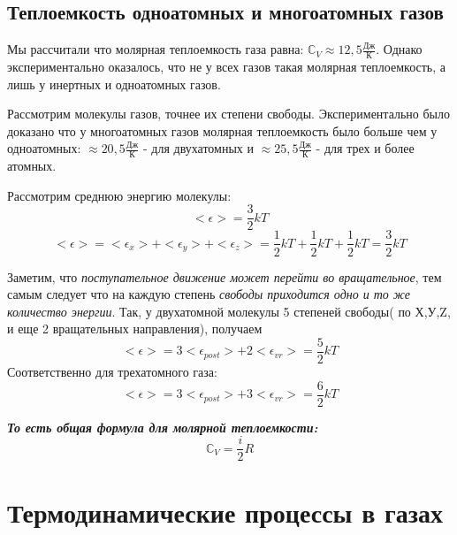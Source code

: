 \documentclass[12pt,a4paper]{report}
\begin{document}
\subsection{Теплоемкость одноатомных и многоатомных газов}
Мы рассчитали что молярная теплоемкость газа равна: $\mathbb{C}_V \approx 12,5 \frac{\text{Дж}}{\text{К}}$. Однако экспериментально оказалось, что не у всех газов такая молярная теплоемкость, а лишь у инертных и одноатомных газов.

\vspace{4px}

Рассмотрим молекулы газов, точнее их степени свободы. Экспериментально было доказано что у многоатомных газов молярная теплоемкость было больше чем у одноатомных: $\approx 20,5 \frac{\text{Дж}}{\text{К}}$ - для двухатомных и $\approx 25,5 \frac{\text{Дж}}{\text{К}}$ - для трех и более атомных.

\vspace{4px}

Рассмотрим среднюю энергию молекулы:
\[ <\epsilon> = \frac{3}{2}kT \]
\[<\epsilon> = <\epsilon_x>+<\epsilon_y>+<\epsilon_z> = \frac{1}{2}kT + \frac{1}{2}kT+ \frac{1}{2}kT = \frac{3}{2}kT\]

Заметим, что \textit{поступательное движение может перейти во вращательное}, тем самым следует что на каждую степень \textit{свободы приходится одно и то же количество энергии}. Так, у двухатомной молекулы 5 степеней свободы( по Х,У,Z, и еще 2 вращательных направления), получаем
\[<\epsilon> = 3<\epsilon_{post}>+ 2<\epsilon_{vr}> = \frac{5}{2}kT\]
Соответственно для трехатомного газа:
\[<\epsilon> = 3<\epsilon_{post}>+ 3<\epsilon_{vr}> = \frac{6}{2}kT\]

\vspace{5px}

\textbf{\textit{То есть общая формула для молярной теплоемкости:}}
\[ \mathbb{C}_V = \frac{i}{2}R\]

\section{Термодинамические процессы в газах}
\end{document}
